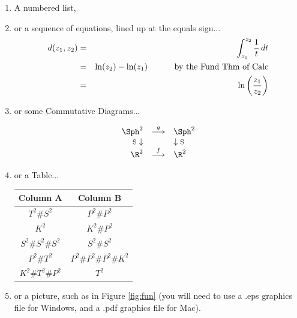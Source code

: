 \documentclass[12pt]{article}   %
\begin{document}
\begin{enumerate}
\item A numbered list,

\item or a sequence of equations, lined up at the equals sign...
\begin{eqnarray*}   %
d(z_1,z_2) & = & \int_{z_1}^{z_2} \frac{1}{t} \, dt \\
& = & \ln(z_2) - \ln(z_1) \mbox{\hspace{1cm} by the Fund Thm of Calc}\\
& = & \ln\left(\frac{z_1}{z_2}\right) \\ %
\end{eqnarray*}

\item or some Commutative Diagrams...

$$\begin{array}{rcl}
\Sph^2  & \stackrel{g}{\longrightarrow} & \Sph^2 \\
\mbox{\footnotesize{S}} \downarrow & & \downarrow \mbox{\footnotesize{S}} \\
\R^2 & \stackrel{f}{\longrightarrow} & \R^2 \\
\end{array}$$

\item or a Table...

\begin{center}
\begin{tabular}{|c|c|}
\hline 
Column A & Column B \\ 
\hline
$T^2 \# S^2$ & $P^2 \# P^2$ \\
$K^2$ & $K^2 \# P^2$ \\
$S^2 \# S^2 \# S^2$ & $S^2 \# S^2$ \\
$P^2 \# T^2$ & $P^2 \# P^2 \# P^2 \# K^2$ \\
$K^2 \# T^2 \# P^2$ & $T^2$ \\
\hline
\end{tabular}
\end{center}

\item or a picture, such as in Figure \ref{fig:fun} (you will need to use a .eps graphics file for Windows, and a .pdf graphics
file for Mac).


\end{enumerate}
\end{document}
